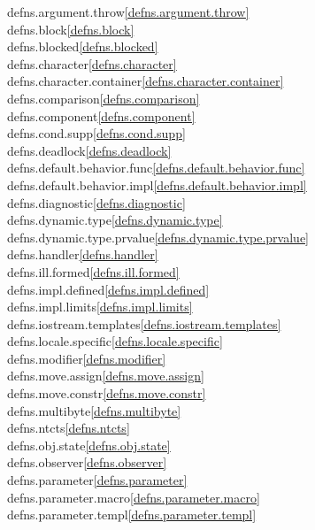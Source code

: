 \begin{multicols}{2}
defns.argument.throw\quad\ref{defns.argument.throw}\\
defns.block\quad\ref{defns.block}\\
defns.blocked\quad\ref{defns.blocked}\\
defns.character\quad\ref{defns.character}\\
defns.character.container\quad\ref{defns.character.container}\\
defns.comparison\quad\ref{defns.comparison}\\
defns.component\quad\ref{defns.component}\\
defns.cond.supp\quad\ref{defns.cond.supp}\\
defns.deadlock\quad\ref{defns.deadlock}\\
defns.default.behavior.func\quad\ref{defns.default.behavior.func}\\
defns.default.behavior.impl\quad\ref{defns.default.behavior.impl}\\
defns.diagnostic\quad\ref{defns.diagnostic}\\
defns.dynamic.type\quad\ref{defns.dynamic.type}\\
defns.dynamic.type.prvalue\quad\ref{defns.dynamic.type.prvalue}\\
defns.handler\quad\ref{defns.handler}\\
defns.ill.formed\quad\ref{defns.ill.formed}\\
defns.impl.defined\quad\ref{defns.impl.defined}\\
defns.impl.limits\quad\ref{defns.impl.limits}\\
defns.iostream.templates\quad\ref{defns.iostream.templates}\\
defns.locale.specific\quad\ref{defns.locale.specific}\\
defns.modifier\quad\ref{defns.modifier}\\
defns.move.assign\quad\ref{defns.move.assign}\\
defns.move.constr\quad\ref{defns.move.constr}\\
defns.multibyte\quad\ref{defns.multibyte}\\
defns.ntcts\quad\ref{defns.ntcts}\\
defns.obj.state\quad\ref{defns.obj.state}\\
defns.observer\quad\ref{defns.observer}\\
defns.parameter\quad\ref{defns.parameter}\\
defns.parameter.macro\quad\ref{defns.parameter.macro}\\
defns.parameter.templ\quad\ref{defns.parameter.templ}\\

\end{multicols}
